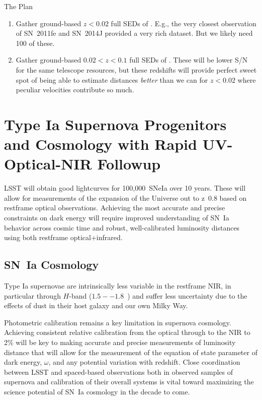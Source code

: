 The Plan
\begin{enumerate}
    \item Gather ground-based $z<0.02$ full SEDs of \sneia.  E.g., the very closest observation of SN~2011fe and SN~2014J provided a very rich dataset.  But we likely need 100 of these.
    \item Gather ground-based $0.02<z<0.1$ full SEDs of \sneia.  These will be lower S/N for the same telescope resources, but these redshifts will provide perfect sweet spot of being able to estimate distances {\em better} than we can for $z<0.02$ \sneia where peculiar velocities contribute so much.
\end{enumerate}

\section{Type Ia Supernova Progenitors and Cosmology with Rapid UV-Optical-NIR Followup}

LSST will obtain good lightcurves for 100,000~SNeIa over 10 years.  These will allow for measurements of the expansion of the Universe out to z~0.8 based on restframe optical observations.  Achieving the most accurate and precise constraints on dark energy will require improved understanding of SN~Ia behavior across cosmic time and robust, well-calibrated luminosity distances using both restframe optical+infrared.

\subsection{SN~Ia Cosmology}

Type Ia supernovae are intrinsically less variable in the restframe NIR, in particular through $H$-band ($1.5--1.8$~\mu) \citep{Krisciunas, Wood-Vasey, CSP} and suffer less uncertainty due to the effects of dust in their host galaxy and our own Milky Way.

Photometric calibration remains a key limitation in supernova cosmology\citep[c.f.][]{Scolnic}.  Achieving consistent relative calibration from the optical through to the NIR to 2\% will be key to making accurate and precise measurements of luminosity distance that will allow for the measurement of the equation of state parameter of dark energy, $\omega$, and any potential variation with redshift.  Close coordination between LSST and spaced-based observations both in observed samples of supernova and calibration of their overall systems is vital toward maximizing the science potential of SN~Ia cosmology in the decade to come. 

